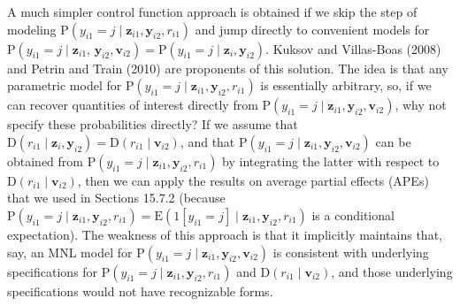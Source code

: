 \documentclass[10pt]{article}
\begin{document}
A much simpler control function approach is obtained if we skip the step of modeling $\mathrm{P}\left(y_{i 1}=j \mid \mathbf{z}_{i 1}, \mathbf{y}_{i 2}, r_{i 1}\right)$ and jump directly to convenient models for $\mathrm{P}\left(y_{i 1}=j \mid \mathbf{z}_{i 1}\right.$, $\left.\mathbf{y}_{i 2}, \mathbf{v}_{i 2}\right)=\mathrm{P}\left(y_{i 1}=j \mid \mathbf{z}_{i}, \mathbf{y}_{i 2}\right)$. Kuksov and Villas-Boas (2008) and Petrin and Train (2010) are proponents of this solution. The idea is that any parametric model for $\mathrm{P}\left(y_{i 1}=j \mid \mathbf{z}_{i 1}, \mathbf{y}_{i 2}, r_{i 1}\right)$ is essentially arbitrary, so, if we can recover quantities of interest directly from $\mathrm{P}\left(y_{i 1}=j \mid \mathbf{z}_{i 1}, \mathbf{y}_{i 2}, \mathbf{v}_{i 2}\right)$, why not specify these probabilities directly? If we assume that $\mathrm{D}\left(r_{i 1} \mid \mathbf{z}_{i}, \mathbf{y}_{i 2}\right)=\mathrm{D}\left(r_{i 1} \mid \mathbf{v}_{i 2}\right)$, and that $\mathrm{P}\left(y_{i 1}=j \mid \mathbf{z}_{i 1}, \mathbf{y}_{i 2}, \mathbf{v}_{i 2}\right)$ can be obtained from $\mathrm{P}\left(y_{i 1}=j \mid \mathbf{z}_{i 1}, \mathbf{y}_{i 2}, r_{i 1}\right)$ by integrating the latter with respect to $\mathrm{D}\left(r_{i 1} \mid \mathbf{v}_{i 2}\right)$, then we can apply the results on average partial effects (APEs) that we used in Sections 15.7.2 (because $\mathrm{P}\left(y_{i 1}=j \mid \mathbf{z}_{i 1}, \mathbf{y}_{i 2}, r_{i 1}\right)=\mathrm{E}\left(1\left[y_{i 1}=j\right] \mid \mathbf{z}_{i 1}, \mathbf{y}_{i 2}, r_{i 1}\right)$ is a conditional expectation). The weakness of this approach is that it implicitly maintains that, say, an MNL model for $\mathrm{P}\left(y_{i 1}=j \mid \mathbf{z}_{i 1}, \mathbf{y}_{i 2}, \mathbf{v}_{i 2}\right)$ is consistent with underlying specifications for $\mathrm{P}\left(y_{i 1}=j \mid \mathbf{z}_{i 1}, \mathbf{y}_{i 2}, r_{i 1}\right)$ and $\mathrm{D}\left(r_{i 1} \mid \mathbf{v}_{i 2}\right)$, and those underlying specifications would not have recognizable forms.
\end{document}
